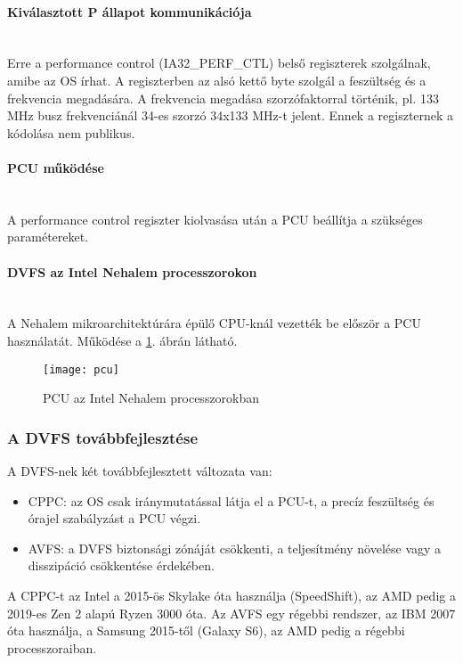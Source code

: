 \paragraph{Kiválasztott P állapot kommunikációja}\mbox{}\\
Erre a performance control (IA32\_PERF\_CTL) belső regiszterek szolgálnak, amibe az OS írhat.
A regiszterben az alsó kettő byte szolgál a feszültség és a frekvencia megadására.
A frekvencia megadása szorzófaktorral történik, pl. 133 MHz busz frekvenciánál 34-es szorzó 34x133 MHz-t jelent.
Ennek a regiszternek a kódolása nem publikus.

\paragraph{PCU működése}\mbox{}\\
A performance control regiszter kiolvasása után a PCU beállítja a szükséges paramétereket.

\paragraph{DVFS az Intel Nehalem processzorokon}\mbox{}\\
A Nehalem mikroarchitektúrára épülő CPU-knál vezették be először a PCU használatát.
Működése a \ref{fig:pcu}. ábrán látható.
\begin{figure}[H]
    \texttt{[image: pcu]}
    \centering
    \caption{PCU az Intel Nehalem processzorokban}
    \label{fig:pcu}
\end{figure}

\subsubsection{A DVFS továbbfejlesztése}
A DVFS-nek két továbbfejlesztett változata van:
\begin{itemize}
    \item CPPC: az OS csak iránymutatással látja el a PCU-t, a precíz feszültség és órajel szabályzást a PCU végzi.
    \item AVFS: a DVFS biztonsági zónáját csökkenti, a teljesítmény növelése vagy a disszipáció csökkentése érdekében.
\end{itemize}
A CPPC-t az Intel a 2015-ös Skylake óta használja (SpeedShift), az AMD pedig a 2019-es Zen 2 alapú Ryzen 3000 óta.
Az AVFS egy régebbi rendszer, az IBM 2007 óta használja, a Samsung 2015-től (Galaxy S6), az AMD pedig a régebbi processzoraiban.

